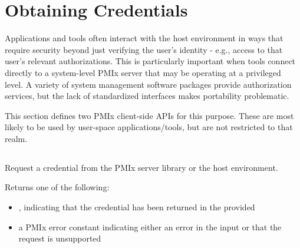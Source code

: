 \section{Obtaining Credentials}
\label{chap:api_security:obtain}

Applications and tools often interact with the host environment in ways that require security beyond just verifying the user's identity - e.g., access to that user's relevant authorizations. This is particularly important when tools connect directly to a system-level \ac{PMIx} server that may be operating at a privileged level. A variety of system management software packages provide authorization services, but the lack of standardized interfaces makes portability problematic.

This section defines two \ac{PMIx} client-side \acp{API} for this purpose. These are most likely to be used by user-space applications/tools, but are not restricted to that realm.

\subsection{}

\summary

Request a credential from the \ac{PMIx} server library or the host environment.

\format


\begin{arglist}
\end{arglist}

Returns one of the following:

\begin{itemize}
    \item {}, indicating that the credential has been returned in the provided 
    \item a \ac{PMIx} error constant indicating either an error in the input or that the request is unsupported
\end{itemize}

